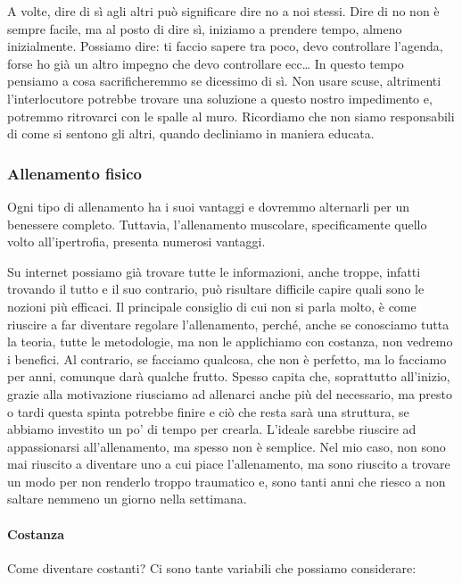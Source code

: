 \documentclass[12pt]{book} %
\begin{document}
A volte, dire di sì agli altri può significare dire no a noi stessi.
Dire di no non è sempre facile, ma al posto di dire sì, iniziamo a prendere tempo, almeno inizialmente. 
Possiamo dire: ti faccio sapere tra poco, devo controllare l'agenda, forse ho già un altro impegno che devo controllare ecc… 
In questo tempo pensiamo a cosa sacrificheremmo se dicessimo di sì. 
Non usare scuse, altrimenti l'interlocutore potrebbe trovare una soluzione a questo nostro impedimento e, potremmo ritrovarci con le spalle al muro. 
Ricordiamo che non siamo responsabili di come si sentono gli altri, quando decliniamo in maniera educata.

\subsubsection{Allenamento fisico}
Ogni tipo di allenamento ha i suoi vantaggi e dovremmo alternarli per un benessere completo. Tuttavia, l'allenamento muscolare, specificamente quello volto all'ipertrofia, presenta numerosi vantaggi.

Su internet possiamo già trovare tutte le informazioni, anche troppe, infatti trovando il tutto e il suo contrario, può risultare difficile capire quali sono le nozioni più efficaci. Il principale consiglio di cui non si parla molto, è come riuscire a far diventare regolare l'allenamento, perché, anche se conosciamo tutta la teoria, tutte le metodologie, ma non le applichiamo con costanza, non vedremo i benefici. Al contrario, se facciamo qualcosa, che non è perfetto, ma lo facciamo per anni, comunque darà qualche frutto. Spesso capita che, soprattutto all'inizio, grazie alla motivazione riusciamo ad allenarci anche più del necessario, ma presto o tardi questa spinta potrebbe finire e ciò che resta sarà una struttura, se abbiamo investito un po' di tempo per crearla. L'ideale sarebbe riuscire ad appassionarsi all'allenamento, ma spesso non è semplice. Nel mio caso, non sono mai riuscito a diventare uno a cui piace l'allenamento, ma sono riuscito a trovare un modo per non renderlo troppo traumatico e, sono tanti anni che riesco a non saltare nemmeno un giorno nella settimana.

\paragraph{Costanza}

Come diventare costanti?
Ci sono tante variabili che possiamo considerare:
\end{document}
